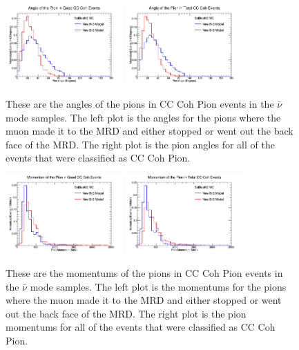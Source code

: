 \documentclass[11pt]{article}
\begin{document}
\begin{figure}[H]
\centering
\includegraphics[width=0.4\textwidth]{ANMPionPlottingImages/7-ANMPionPlotting.png}
\includegraphics[width=0.4\textwidth]{ANMPionPlottingImages/10-ANMPionPlotting.png}
\caption{These are the angles of the pions in CC Coh Pion events in the $\bar{\nu}$ mode samples. The left plot is the angles for the pions where the muon made it to the MRD and either stopped or went out the back face of the MRD. The right plot is the pion angles for all of the events that were classified as CC Coh Pion.}
\end{figure}

\begin{figure}[H]
\centering
\includegraphics[width=0.4\textwidth]{ANMPionPlottingImages/8-ANMPionPlotting.png}
\includegraphics[width=0.4\textwidth]{ANMPionPlottingImages/11-ANMPionPlotting.png}
\caption{These are the momentums of the pions in CC Coh Pion events in the $\bar{\nu}$ mode samples. The left plot is the momentums for the pions where the muon made it to the MRD and either stopped or went out the back face of the MRD. The right plot is the pion momentums for all of the events that were classified as CC Coh Pion.}
\end{figure}
\end{document}

